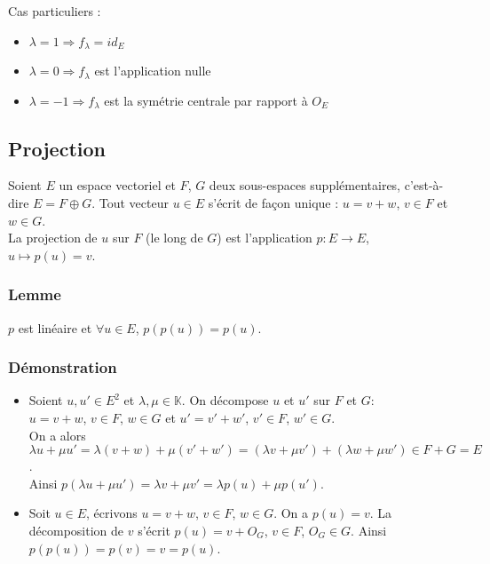 \documentclass[a4paper,10pt]{book} %
\newcommand{\K}{\mathbb{K}}
\begin{document}
Cas particuliers : \begin{itemize}[label=$\cdot$]
\item $\lambda=1 \Rightarrow f_\lambda=id_E$
\item $\lambda=0 \Rightarrow f_\lambda$ est l'application nulle
\item $\lambda=-1 \Rightarrow f_\lambda$ est la symétrie centrale par rapport à $O_E$
\end{itemize}

\subsection{Projection}\label{Projection}
Soient $E$ un espace vectoriel et $F$, $G$ deux sous-espaces supplémentaires, c'est-à-dire $E=F\oplus G$.
Tout vecteur $u\in E$ s'écrit de façon unique : $u=v+w$, $v\in F$ et $w\in G$.\\

La projection de $u$ sur $F$ (le long de $G$) est l'application $p:E\rightarrow E$, $u\mapsto p(u)=v$.


\subsubsection{Lemme}
$p$ est linéaire et $\forall u\in E$, $p(p(u))=p(u)$.

\subsubsection{Démonstration}
\begin{itemize}
\item Soient $u,u'\in E^2$ et $\lambda,\mu\in\K$. On décompose $u$ et $u'$ sur $F$ et $G$:\\
$u=v+w$, $v\in F$, $w\in G$ et $u'=v'+w'$, $v'\in F$, $w'\in G$.\\

On a alors $\lambda u+\mu u'=\lambda(v+w)+\mu(v'+w')=(\lambda v+\mu v')+(\lambda w+\mu w') \in F+G=E$.\\
Ainsi $p(\lambda u+\mu u')=\lambda v+\mu v'=\lambda p(u)+\mu p(u')$.\\

\item Soit $u\in E$, écrivons $u=v+w$, $v\in F$, $w\in G$. On a $p(u)=v$. La décomposition de $v$ s'écrit $p(u)=v+O_G$, $v\in F$, $O_G\in G$. Ainsi $p(p(u))=p(v)=v=p(u)$.
\end{itemize}

\newpage
\end{document}

